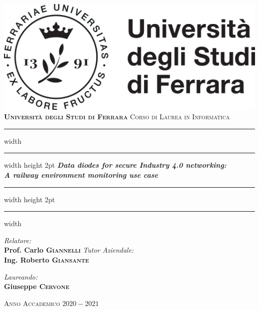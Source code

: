 \documentclass[a4paper, 12pt]{book}
\begin{document}

\begin{titlepage}
	\centering
	\includegraphics[]{logo.png}\\
	\vspace*{1cm}
	\huge \textbf{\textsc{Università degli Studi di Ferrara}}
	\Large \textsc{Corso di Laurea in Informatica}
	
	\vspace*{1.5cm}
	\hrule width \hsize \kern 1mm \hrule width \hsize height 2pt
	\vspace*{10mm}
	\Huge \emph{\textbf{Data diodes for secure Industry 4.0 networking: \\ A railway environment monitoring use case}}
	\vspace*{10mm}
	\hrule width \hsize height 2pt
	\vspace*{1mm}
	\hrule width \hsize \kern 1mm
	
	\vspace*{5mm}
	\begin{minipage}{0.46\textwidth}
		\begin{flushleft} \Large
			\emph{Relatore:}\\
			\Large \textbf{Prof. Carlo \textsc{Giannelli}}
            \emph{Tutor Aziendale:}\\
			\Large \textbf{Ing. Roberto \textsc{Giansante}}
		\end{flushleft}
	\end{minipage}
	\begin{minipage}{0.45\textwidth}
		\begin{flushright} \Large
			\emph{Laureando:} \\
			\Large \textbf{Giuseppe \textsc{Cervone}}
		\end{flushright}
	\end{minipage}
	
	\vspace*{20mm}
	\Large \textsc{Anno Accademico $2020-2021$}
\end{titlepage}
\restoregeometry
\end{document}
